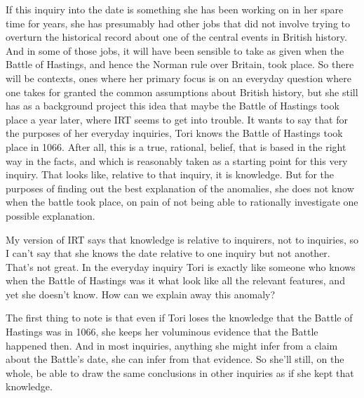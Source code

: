 \documentclass[
  12pt,
  letterpaper,
]{scrbook}
\begin{document}
If this inquiry into the date is something she has been working on in
her spare time for years, she has presumably had other jobs that did not
involve trying to overturn the historical record about one of the
central events in British history. And in some of those jobs, it will
have been sensible to take as given when the Battle of Hastings, and
hence the Norman rule over Britain, took place. So there will be
contexts, ones where her primary focus is on an everyday question where
one takes for granted the common assumptions about British history, but
she still has as a background project this idea that maybe the Battle of
Hastings took place a year later, where IRT seems to get into trouble.
It wants to say that for the purposes of her everyday inquiries, Tori
knows the Battle of Hastings took place in 1066. After all, this is a
true, rational, belief, that is based in the right way in the facts, and
which is reasonably taken as a starting point for this very inquiry.
That looks like, relative to that inquiry, it is knowledge. But for the
purposes of finding out the best explanation of the anomalies, she does
not know when the battle took place, on pain of not being able to
rationally investigate one possible explanation.

My version of IRT says that knowledge is relative to inquirers, not to
inquiries, so I can't say that she knows the date relative to one
inquiry but not another. That's not great. In the everyday inquiry Tori
is exactly like someone who knows when the Battle of Hastings was it
what look like all the relevant features, and yet she doesn't know. How
can we explain away this anomaly?

The first thing to note is that even if Tori loses the knowledge that
the Battle of Hastings was in 1066, she keeps her voluminous evidence
that the Battle happened then. And in most inquiries, anything she might
infer from a claim about the Battle's date, she can infer from that
evidence. So she'll still, on the whole, be able to draw the same
conclusions in other inquiries as if she kept that knowledge.
\end{document}
